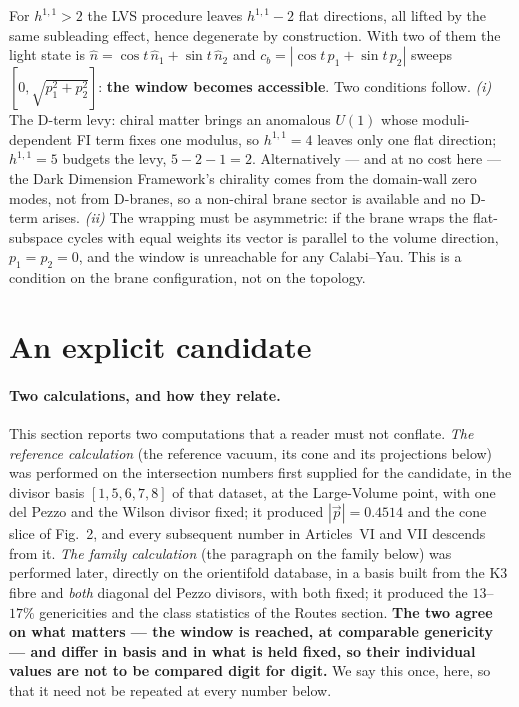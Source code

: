 For $h^{1,1}>2$ the LVS procedure leaves $h^{1,1}-2$ flat directions, all lifted by the same subleading effect, hence degenerate by construction. With two of them the light state is $\hat n=\cos t\,\hat n_1+\sin t\,\hat n_2$ and $c_b=|\cos t\,p_1+\sin t\,p_2|$ sweeps $[0,\sqrt{p_1^2+p_2^2}]$: \textbf{the window becomes accessible}. Two conditions follow. \emph{(i)} The D-term levy: chiral matter brings an anomalous $U(1)$ whose moduli-dependent FI term fixes one modulus, so $h^{1,1}=4$ leaves only one flat direction; $h^{1,1}=5$ budgets the levy, $5-2-1=2$. Alternatively --- and at no cost here --- the Dark Dimension Framework's chirality comes from the domain-wall zero modes, not from D-branes, so a non-chiral brane sector is available and no D-term arises. \emph{(ii)} The wrapping must be asymmetric: if the brane wraps the flat-subspace cycles with equal weights its vector is parallel to the volume direction, $p_1=p_2=0$, and the window is unreachable for any Calabi--Yau. This is a condition on the brane configuration, not on the topology.

\section{An explicit candidate}
\paragraph{Two calculations, and how they relate.} This section reports two computations that a reader must not conflate. \emph{The reference calculation} (the reference vacuum, its cone and its projections below) was performed on the intersection numbers first supplied for the candidate, in the divisor basis $[1,5,6,7,8]$ of that dataset, at the Large-Volume point, with one del Pezzo and the Wilson divisor fixed; it produced $|\vec p|=0.4514$ and the cone slice of Fig.~2, and every subsequent number in Articles~VI and VII descends from it. \emph{The family calculation} (the paragraph on the family below) was performed later, directly on the orientifold database, in a basis built from the K3 fibre and \emph{both} diagonal del Pezzo divisors, with both fixed; it produced the $13$--$17\%$ genericities and the class statistics of the Routes section. \textbf{The two agree on what matters --- the window is reached, at comparable genericity --- and differ in basis and in what is held fixed, so their individual values are not to be compared digit for digit.} We say this once, here, so that it need not be repeated at every number below.


